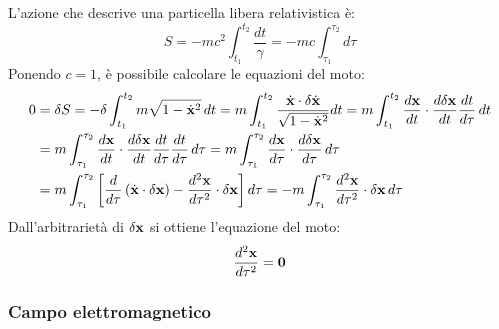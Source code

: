 L'azione che descrive una particella libera relativistica è:
\begin{equation}
	S = - mc^2 \int_{t_1}^{t_2} \frac{dt}{\gamma} = -mc \int_{\tau_1}^{\tau_2} d\tau
	\label{eq:5.5}
\end{equation}
Ponendo $ c = 1 $, è possibile calcolare le equazioni del moto:
\begin{equation*}
	\begin{split}
		0
		&= \delta S = - \delta \int_{t_1}^{t_2} m \sqrt{1 - \dot{\mathbf{x}}^2} \,dt = m \int_{t_1}^{t_2} \frac{\dot{\mathbf{x}} \cdot \delta\dot{\mathbf{x}}}{\sqrt{1 - \dot{\mathbf{x}}^2}} dt = m \int_{t_1}^{t_2} \frac{d\mathbf{x}}{dt} \cdot \frac{d \delta\mathbf{x}}{dt} \frac{dt}{d\tau} \,dt\\
		&= m \int_{\tau_1}^{\tau_2} \frac{d\mathbf{x}}{dt} \cdot \frac{d \delta\mathbf{x}}{dt} \frac{dt}{d\tau} \frac{dt}{d\tau} \,d\tau = m \int_{\tau_1}^{\tau_2} \frac{d\mathbf{x}}{d\tau} \cdot \frac{d\delta\mathbf{x}}{d\tau} \,d\tau\\
		&= m \int_{\tau_1}^{\tau_2} \left[ \frac{d}{d\tau} \left( \dot{\mathbf{x}} \cdot \delta\mathbf{x} \right) - \frac{d^2\mathbf{x}}{d\tau^2} \cdot \delta\mathbf{x} \right] d\tau = - m \int_{\tau_1}^{\tau_2} \frac{d^2 \mathbf{x}}{d\tau^2} \cdot \delta\mathbf{x} \,d\tau
	\end{split}
\end{equation*}
Dall'arbitrarietà di $ \delta\mathbf{x} $ si ottiene l'equazione del moto:
\begin{equation}
	\frac{d^2 \mathbf{x}}{d\tau^2} = \mathbf{0}
	\label{eq:5.6}
\end{equation}

\subsubsection{Campo elettromagnetico}

